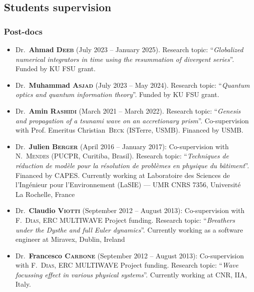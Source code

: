 \documentclass[final, a4paper, oneside, 12pt]{article}
\numberwithin{equation}{section}
\begin{document}
\subsection{Students supervision}

\subsubsection{Post-docs}

\begin{itemize}

  \item Dr.~\textbf{Ahmad \textsc{Deeb}} (July 2023 -- January 2025). Research topic: ``\textit{Globalized numerical integrators in time using the resummation of divergent series}''. Funded by KU FSU grant.

  \item Dr.~\textbf{Muhammad \textsc{Asjad}} (July 2023 -- May 2024). Research topic: ``\textit{Quantum optics and quantum information theory}''. Funded by KU FSU grant.

  \item Dr.~\textbf{Amin \textsc{Rashidi}} (March 2021 -- March 2022). Research topic: ``\textit{Genesis and propagation of a tsunami wave on an accretionary prism}''. Co-supervision with Prof. Emeritus Christian~\textsc{Beck} (ISTerre, USMB). Financed by USMB.

  \item Dr.~\textbf{Julien \textsc{Berger}} (April 2016 -- January 2017): Co-supervision with N.~\textsc{Mendes} (PUCPR, Curitiba, Brasil). Research topic: ``\textit{Techniques de r\'eduction de mod\`ele pour la r\'esolution de probl\`emes en physique du b\^atiment}''. Financed by CAPES. Currently working at Laboratoire des Sciences de l'Ing\'enieur pour l'Environnement (LaSIE) --- UMR CNRS 7356, Universit\'e La Rochelle, France
  
  \item Dr.~\textbf{Claudio \textsc{Viotti}} (September 2012 -- August 2013): Co-supervision with F.~\textsc{Dias}, ERC MULTIWAVE Project funding. Research topic: ``\textit{Breathers under the Dysthe and full Euler dynamics}''. Currently working as a software engineer at Miravex, Dublin, Ireland
  
  \item Dr.~\textbf{Francesco \textsc{Carbone}} (September 2012 -- August 2013): Co-supervision with F.~\textsc{Dias}, ERC MULTIWAVE Project funding. Research topic: ``\textit{Wave focussing effect in various physical systems}''. Currently working at CNR, IIA, Italy.

\end{itemize}
\end{document}
